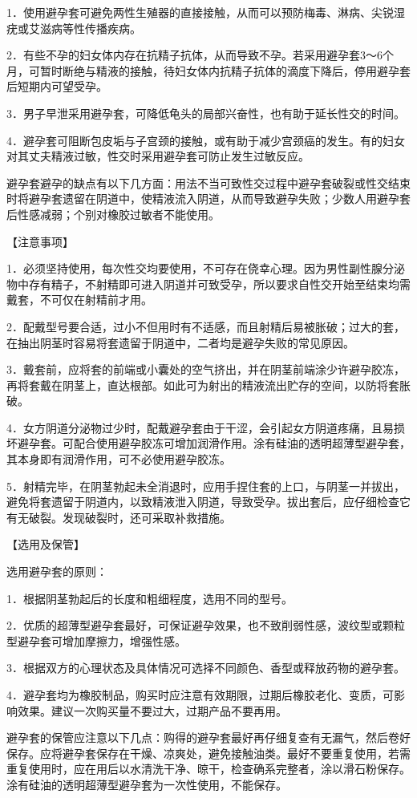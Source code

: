 \documentclass[12pt,UTF8,openany]{ctexbook}
\begin{document}
1．使用避孕套可避免两性生殖器的直接接触，从而可以预防梅毒、淋病、尖锐湿疣或艾滋病等性传播疾病。

2．有些不孕的妇女体内存在抗精子抗体，从而导致不孕。若采用避孕套3～6个月，可暂时断绝与精液的接触，待妇女体内抗精子抗体的滴度下降后，停用避孕套后短期内可望受孕。

3．男子早泄采用避孕套，可降低龟头的局部兴奋性，也有助于延长性交的时间。

4．避孕套可阻断包皮垢与子宫颈的接触，或有助于减少宫颈癌的发生。有的妇女对其丈夫精液过敏，性交时采用避孕套可防止发生过敏反应。

避孕套避孕的缺点有以下几方面：用法不当可致性交过程中避孕套破裂或性交结束时将避孕套遗留在阴道中，使精液流入阴道，从而导致避孕失败；少数人用避孕套后性感减弱；个别对橡胶过敏者不能使用。

【注意事项】

1．必须坚持使用，每次性交均要使用，不可存在侥幸心理。因为男性副性腺分泌物中存有精子，不射精即可进入阴道并可致受孕，所以要求自性交开始至结束均需戴套，不可仅在射精前才用。

2．配戴型号要合适，过小不但用时有不适感，而且射精后易被胀破；过大的套，在抽出阴茎时容易将套遗留于阴道中，二者均是避孕失败的常见原因。

3．戴套前，应将套的前端或小囊处的空气挤出，并在阴茎前端涂少许避孕胶冻，再将套戴在阴茎上，直达根部。如此可为射出的精液流出贮存的空间，以防将套胀破。

4．女方阴道分泌物过少时，配戴避孕套由于干涩，会引起女方阴道疼痛，且易损坏避孕套。可配合使用避孕胶冻可增加润滑作用。涂有硅油的透明超薄型避孕套，其本身即有润滑作用，可不必使用避孕胶冻。

5．射精完毕，在阴茎勃起未全消退时，应用手捏住套的上口，与阴茎一并拔出，避免将套遗留于阴道内，以致精液泄入阴道，导致受孕。拔出套后，应仔细检查它有无破裂。发现破裂时，还可采取补救措施。

【选用及保管】

选用避孕套的原则：

1．根据阴茎勃起后的长度和粗细程度，选用不同的型号。

2．优质的超薄型避孕套最好，可保证避孕效果，也不致削弱性感，波纹型或颗粒型避孕套可增加摩擦力，增强性感。

3．根据双方的心理状态及具体情况可选择不同颜色、香型或释放药物的避孕套。

4．避孕套均为橡胶制品，购买时应注意有效期限，过期后橡胶老化、变质，可影响效果。建议一次购买量不要过大，过期产品不要再用。

避孕套的保管应注意以下几点：购得的避孕套最好再仔细复查有无漏气，然后卷好保存。应将避孕套保存在干燥、凉爽处，避免接触油类。最好不要重复使用，若需重复使用时，应在用后以水清洗干净、晾干，检查确系完整者，涂以滑石粉保存。涂有硅油的透明超薄型避孕套为一次性使用，不能保存。
\end{document}
